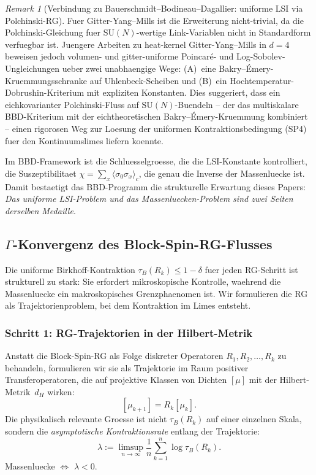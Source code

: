 \documentclass[12pt,a4paper]{article}
\theoremstyle{definition}
\theoremstyle{plain}
\theoremstyle{remark}
\newtheorem{remark}[definition]{Remark}
\begin{document}
\begin{remark}[Verbindung zu Bauerschmidt--Bodineau--Dagallier: uniforme LSI via Polchinski-RG]
Fuer Gitter-Yang--Mills ist die Erweiterung nicht-trivial, da die Polchinski-Gleichung fuer $\mathrm{SU}(N)$-wertige Link-Variablen nicht in Standardform verfuegbar ist. Juengere Arbeiten zu heat-kernel Gitter-Yang--Mills in $d=4$ beweisen jedoch volumen- und gitter-uniforme Poincar\'e- und Log-Sobolev-Ungleichungen ueber zwei unabhaengige Wege: (A)~eine Bakry--\'Emery-Kruemmungsschranke auf Uhlenbeck-Scheiben und (B)~ein Hochtemperatur-Dobrushin-Kriterium mit expliziten Konstanten. Dies suggeriert, dass ein eichkovarianter Polchinski-Fluss auf $\mathrm{SU}(N)$-Buendeln -- der das multiskalare BBD-Kriterium mit der eichtheoretischen Bakry--\'Emery-Kruemmung kombiniert -- einen rigorosen Weg zur Loesung der uniformen Kontraktionsbedingung (SP4) fuer den Kontinuumslimes liefern koennte.

Im BBD-Framework ist die Schluesselgroesse, die die LSI-Konstante kontrolliert, die Suszeptibilitaet $\chi = \sum_x \langle \sigma_0 \sigma_x \rangle_c$, die genau die Inverse der Massenluecke ist. Damit bestaetigt das BBD-Programm die strukturelle Erwartung dieses Papers: \emph{Das uniforme LSI-Problem und das Massenluecken-Problem sind zwei Seiten derselben Medaille}.
\end{remark}

\subsection{$\Gamma$-Konvergenz des Block-Spin-RG-Flusses}\label{sec:gamma-rg}

Die uniforme Birkhoff-Kontraktion $\tau_B(R_k) \leq 1 - \delta$ fuer jeden RG-Schritt ist strukturell zu stark: Sie erfordert mikroskopische Kontrolle, waehrend die Massenluecke ein makroskopisches Grenzphaenomen ist. Wir formulieren die RG als Trajektorienproblem, bei dem Kontraktion im Limes entsteht.

\subsubsection*{Schritt 1: RG-Trajektorien in der Hilbert-Metrik}

Anstatt die Block-Spin-RG als Folge diskreter Operatoren $R_1, R_2, \ldots, R_k$ zu behandeln, formulieren wir sie als Trajektorie im Raum positiver Transferoperatoren, die auf projektive Klassen von Dichten $[\mu]$ mit der Hilbert-Metrik~$d_H$ wirken:
\[
  [\mu_{k+1}] = R_k[\mu_k].
\]
Die physikalisch relevante Groesse ist nicht $\tau_B(R_k)$ auf einer einzelnen Skala, sondern die \emph{asymptotische Kontraktionsrate} entlang der Trajektorie:
\begin{equation}\label{eq:lyapunov-rg}
  \lambda := \limsup_{n \to \infty} \frac{1}{n} \sum_{k=1}^{n} \log \tau_B(R_k).
\end{equation}
Massenluecke $\Leftrightarrow$ $\lambda < 0$.
\end{document}
